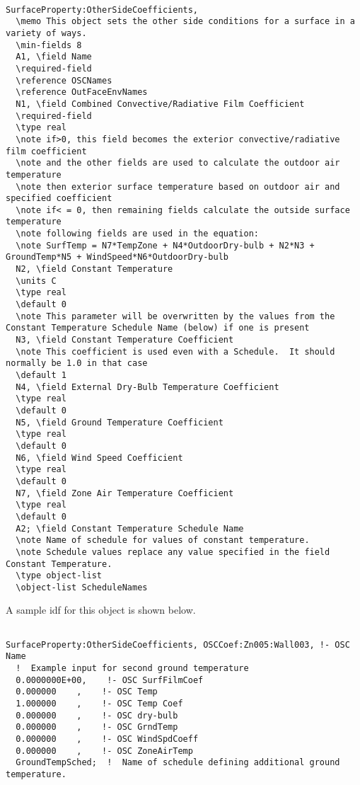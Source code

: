 \begin{lstlisting}

SurfaceProperty:OtherSideCoefficients,
  \memo This object sets the other side conditions for a surface in a variety of ways.
  \min-fields 8
  A1, \field Name
  \required-field
  \reference OSCNames
  \reference OutFaceEnvNames
  N1, \field Combined Convective/Radiative Film Coefficient
  \required-field
  \type real
  \note if>0, this field becomes the exterior convective/radiative film coefficient
  \note and the other fields are used to calculate the outdoor air temperature
  \note then exterior surface temperature based on outdoor air and specified coefficient
  \note if< = 0, then remaining fields calculate the outside surface temperature
  \note following fields are used in the equation:
  \note SurfTemp = N7*TempZone + N4*OutdoorDry-bulb + N2*N3 + GroundTemp*N5 + WindSpeed*N6*OutdoorDry-bulb
  N2, \field Constant Temperature
  \units C
  \type real
  \default 0
  \note This parameter will be overwritten by the values from the Constant Temperature Schedule Name (below) if one is present
  N3, \field Constant Temperature Coefficient
  \note This coefficient is used even with a Schedule.  It should normally be 1.0 in that case
  \default 1
  N4, \field External Dry-Bulb Temperature Coefficient
  \type real
  \default 0
  N5, \field Ground Temperature Coefficient
  \type real
  \default 0
  N6, \field Wind Speed Coefficient
  \type real
  \default 0
  N7, \field Zone Air Temperature Coefficient
  \type real
  \default 0
  A2; \field Constant Temperature Schedule Name
  \note Name of schedule for values of constant temperature.
  \note Schedule values replace any value specified in the field Constant Temperature.
  \type object-list
  \object-list ScheduleNames
\end{lstlisting}

A sample idf for this object is shown below.

\begin{lstlisting}

SurfaceProperty:OtherSideCoefficients, OSCCoef:Zn005:Wall003, !- OSC Name
  !  Example input for second ground temperature
  0.0000000E+00,    !- OSC SurfFilmCoef
  0.000000    ,    !- OSC Temp
  1.000000    ,    !- OSC Temp Coef
  0.000000    ,    !- OSC dry-bulb
  0.000000    ,    !- OSC GrndTemp
  0.000000    ,    !- OSC WindSpdCoeff
  0.000000    ,    !- OSC ZoneAirTemp
  GroundTempSched;  !  Name of schedule defining additional ground temperature.
\end{lstlisting}

